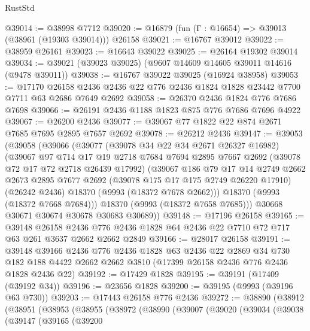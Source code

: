 \begin{lexlean}{RustStd}
\begin{coremodule}
@39014 := @38998 @7712
@39020 := @16879 (fun (Γ : @16654) => @39013 (@38961 (@19303 @39014))) @26158
@39021 := @16767 @39012
@39022 := @38959 @26161
@39023 := @16643 @39022
@39025 := @26164 @19302 @39014
@39034 := @39021 (@39023 @39025) (@9607 @14609 @14605 @39011 @14616 (@9478 @39011))
@39038 := @16767 @39022 @39025 (@16924 @38958)
@39053 := @17170
    @26158
    @2436
    @2436
    @22
    @776
    @2436
    @1824
    @1828
    @23442
    @7700
    @7711
    @63
    @2686
    @7649
    @2692
@39058 := @26370 @2436 @1824 @776 @7686 @7698
@39066 := @26191 @2436 @1188 @1823 @875 @776 @7686 @7696 @4922
@39067 := @26200 @2436
@39077 := @39067 @77 @1822 @22 @874 @2671 @7685 @7695 @2895 @7657 @2692
@39078 := @26212 @2436
@39147 := @39053
    (@39058
      (@39066
        (@39077
          (@39078 @34 @22 @34 @2671 @26327 @16982)
          (@39067
            @97
            @714
            @17
            @19
            @2718
            @7684
            @7694
            @2895
            @7667
            @2692
            (@39078 @72 @17 @72 @2718 @26439 @17992)
            (@39067
              @186
              @79
              @17
              @14
              @2749
              @2662
              @2673
              @2895
              @7677
              @2692
              (@39078 @175 @17 @175 @2749 @26220 @17910)
              (@26242 @2436)
              @18370
              (@9993 (@18372 @7678 @2662)))
            @18370
            (@9993 (@18372 @7668 @7684)))
          @18370
          (@9993 (@18372 @7658 @7685)))
        @30668
        @30671
        @30674
        @30678
        @30683
        @30689))
@39148 := @17196 @26158
@39165 := @39148
    @26158
    @2436
    @776
    @2436
    @1828
    @64
    @2436
    @22
    @7710
    @72
    @717
    @63
    @261
    @3637
    @2662
    @2662
    @2849
@39166 := @28017 @26158
@39191 := @39148
    @39166
    @2436
    @776
    @2436
    @1828
    @63
    @2436
    @22
    @2869
    @34
    @730
    @182
    @188
    @4422
    @2662
    @2662
    @3810
    (@17399 @26158 @2436 @776 @2436 @1828 @2436 @22)
@39192 := @17429 @1828
@39195 := @39191 (@17409 (@39192 @34))
@39196 := @23656 @1828
@39200 := @39195 (@9993 (@39196 @63 @730))
@39203 := @17443 @26158 @776 @2436
@39272 := @38890
    (@38912
      (@38951
        (@38953
          (@38955
            (@38972
              (@38990
                (@39007
                  (@39020
                    (@39034
                      (@39038
                        (@39147
                          (@39165
                            (@39200

\end{coremodule}
\end{lexlean}
